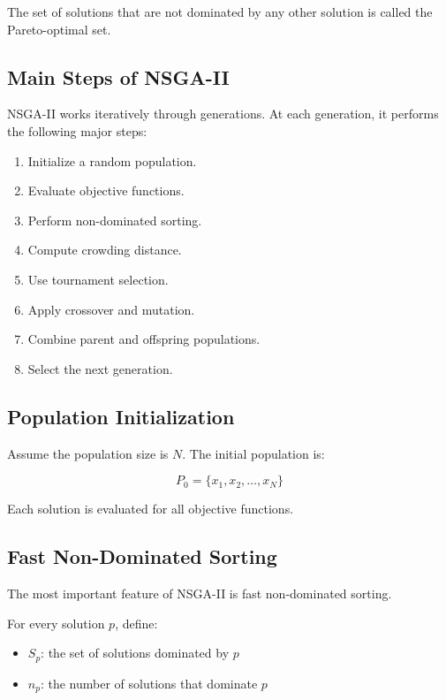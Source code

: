 \documentclass[11pt]{article}
\begin{document}
The set of solutions that are not dominated by any other solution is called the Pareto-optimal set.

\subsection{Main Steps of NSGA-II}

NSGA-II works iteratively through generations. At each generation, it performs the following major steps:

\begin{enumerate}
    \item Initialize a random population.
    \item Evaluate objective functions.
    \item Perform non-dominated sorting.
    \item Compute crowding distance.
    \item Use tournament selection.
    \item Apply crossover and mutation.
    \item Combine parent and offspring populations.
    \item Select the next generation.
\end{enumerate}

\subsection{Population Initialization}

Assume the population size is $N$. The initial population is:

\begin{equation}
P_0 = \{x_1, x_2, \dots, x_N\}
\end{equation}

Each solution is evaluated for all objective functions.

\subsection{Fast Non-Dominated Sorting}

The most important feature of NSGA-II is fast non-dominated sorting.

For every solution $p$, define:

\begin{itemize}
    \item $S_p$: the set of solutions dominated by $p$
    \item $n_p$: the number of solutions that dominate $p$
\end{itemize}
\end{document}
